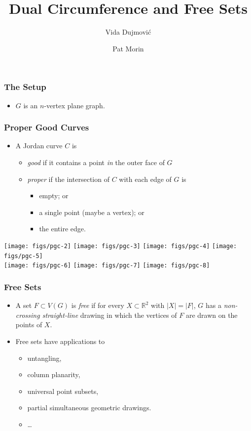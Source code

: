 \documentclass[xcolor=dvipsnames]{beamer}
\title{Dual Circumference and Free Sets}
\author{Vida Dujmović \and Pat Morin}
\newcommand{\R}{\mathbb{R}}
\begin{document}
\begin{frame}
  \titlepage
\end{frame}

\begin{frame}
   \frametitle{The Setup}

   \begin{itemize}
      \item $G$ is an $n$-vertex plane graph.
   \end{itemize}
\end{frame}

\begin{frame}
  \frametitle{Proper Good Curves}
  
  \begin{itemize}
     \item A Jordan curve $C$ is 
     \begin{itemize}
        \item \emph{good} if it contains a point \emph{in} the outer face of $G$
        \item \emph{proper} if the intersection of $C$ with each edge of $G$ is
         \begin{itemize}
            \item empty; or
            \item a single point (maybe a vertex); or
            \item the entire edge.
         \end{itemize}
     \end{itemize}
  \end{itemize}
  \begin{center}
    \texttt{[image: figs/pgc-2]}
    \texttt{[image: figs/pgc-3]}
    \texttt{[image: figs/pgc-4]}
    \texttt{[image: figs/pgc-5]} \\
    \texttt{[image: figs/pgc-6]}
    \texttt{[image: figs/pgc-7]}
    \texttt{[image: figs/pgc-8]}
  \end{center}
\end{frame}

\begin{frame}
  \frametitle{Free Sets}

   \begin{itemize}[<+->]
     \item A set $F\subset V(G)$ is \emph{free} if for every
     $X\subset\R^2$ with $|X|=|F|$, $G$ has a \emph{non-crossing
     straight-line} drawing in which the vertices of $F$ are drawn on
     the points of $X$.

     \item Free sets have applications to
     \begin{itemize}
        \item untangling, 
        \item column planarity, 
        \item universal point subsets, 
        \item partial simultaneous geometric drawings.
        \item \ldots
     \end{itemize}
   \end{itemize}
\end{frame}
\end{document}
